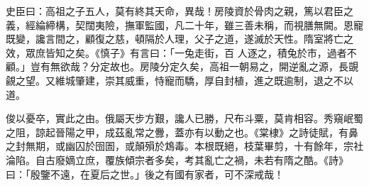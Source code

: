 \begin{pinyinscope}
 史臣曰：高祖之子五人，莫有終其天命，異哉！房陵資於骨肉之親，篤以君臣之義，經綸締構，契闊夷險，撫軍監國，凡二十年，雖三善未稱，而視膳無闕。恩寵既變，讒言間之，顧復之慈，頓隔於人理，父子之道，遂滅於天性。隋室將亡之效，眾庶皆知之矣。《慎子》有言曰：「一兔走街，百
 人逐之，積兔於市，過者不顧。」豈有無欲哉？分定故也。房陵分定久矣，高祖一朝易之，開逆亂之源，長覬覦之望。又維城肇建，崇其威重，恃寵而驕，厚自封植，進之既逾制，退之不以道。



 俊以憂卒，實此之由。俄屬天步方艱，讒人已勝，尺布斗粟，莫肯相容。秀窺岷蜀之阻，諒起晉陽之甲，成茲亂常之釁，蓋亦有以動之也。《棠棣》之詩徒賦，有鼻之封無期，或幽囚於囹圄，或顛殞於鴆毒。本根既絕，枝葉畢剪，十有餘年，宗社淪陷。自古廢嫡立庶，覆族傾宗者多矣，考其亂亡之禍，未若有隋之酷。《詩》曰：「殷鑒不遠，在夏后之世。」後之有國有家者，可不深戒哉！



\end{pinyinscope}